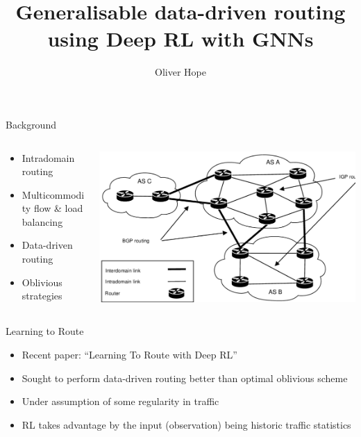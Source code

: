 \documentclass{beamer}
\title{Generalisable data-driven routing using Deep RL with GNNs}
\author{Oliver Hope}
\institute{Jesus College}\date{}
\begin{document}
\maketitle

\begin{frame}{Background}
\begin{columns}
  \begin{column}{0.5\textwidth}
    \begin{itemize}
      \item Intradomain routing
      \item Multicommodity flow \& load balancing
      \item Data-driven routing
      \item Oblivious strategies\cite{racke2002minimizing}
    \end{itemize}
  \end{column}
  \begin{column}{0.5\textwidth}
    \includegraphics[width=\textwidth]{figures/intradomain.png}
  \end{column}
\end{columns}
\end{frame}

\begin{frame}{Learning to Route}
  \begin{itemize}
    \item Recent paper: ``Learning To Route with Deep RL''\cite{valadarsky2017learning}
    \item Sought to perform data-driven routing better than optimal oblivious scheme
    \item Under assumption of some regularity in traffic
    \item RL takes advantage by the input (observation) being historic traffic statistics
  \end{itemize}
\end{frame}
\end{document}
